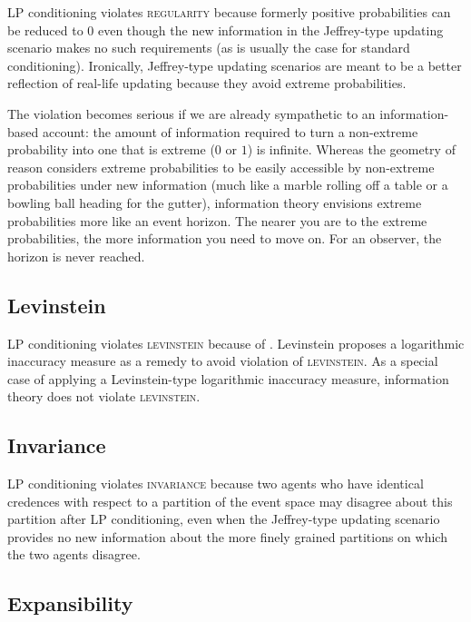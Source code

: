 \documentclass[11pt]{article}
\begin{document}
LP conditioning violates \textsc{regularity} because formerly positive
probabilities can be reduced to $0$ even though the new information in
the Jeffrey-type updating scenario makes no such requirements (as is
usually the case for standard conditioning). Ironically, Jeffrey-type
updating scenarios are meant to be a better reflection of real-life
updating because they avoid extreme probabilities.

The violation becomes serious if we are already sympathetic to an
infor\-ma\-tion-based account: the amount of information required to
turn a non-extreme probability into one that is extreme ($0$ or $1$)
is infinite. Whereas the geometry of reason considers extreme
probabilities to be easily accessible by non-extreme probabilities
under new information (much like a marble rolling off a table or a
bowling ball heading for the gutter), information theory envisions
extreme probabilities more like an event horizon. The nearer you are
to the extreme probabilities, the more information you need to move
on. For an observer, the horizon is never reached.

\subsection{Levinstein}
\label{Levinstein}

LP conditioning violates \textsc{levinstein} because of 
. Levinstein proposes a logarithmic
inaccuracy measure as a remedy to avoid violation of
\textsc{levinstein}. As a special case of applying a Levinstein-type
logarithmic inaccuracy measure, information theory does not violate
\textsc{levinstein}.

\subsection{Invariance}
\label{Invariance}

LP conditioning violates \textsc{invariance} because two agents who
have identical credences with respect to a partition of the event
space may disagree about this partition after LP conditioning, even
when the Jeffrey-type updating scenario provides no new information
about the more finely grained partitions on which the two agents
disagree.

\subsection{Expansibility}
\label{Expansibility}
\end{document}
